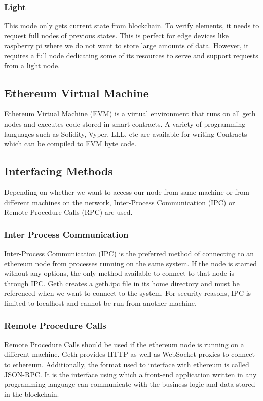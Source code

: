 \documentclass[11pt,openright]{report}
\begin{document}
\subsubsection{Light}
This mode only gets current state from blockchain. To verify elements, it needs to request full nodes of previous states. This is perfect for edge devices like raspberry pi where we do not want to store large amounts of data. However, it requires a full node dedicating some of its resources to serve and support requests from a light node.

\subsection{Ethereum Virtual Machine}
Ethereum Virtual Machine (EVM) is a virtual environment that runs on all geth nodes and executes code stored in smart contracts. A variety of programming languages such as Solidity, Vyper, LLL, etc are available for writing Contracts which can be compiled to EVM byte code.

\subsection{Interfacing Methods}
Depending on whether we want to access our node from same machine or from different machines on the network, Inter-Process Communication (IPC) or Remote Procedure Calls (RPC) are used.

\subsubsection{Inter Process Communication}
Inter-Process Communication (IPC) is the preferred method of connecting to an ethereum node from processes running on the same system. If the node is started without any options, the only method available to connect to that node is through IPC. Geth creates a geth.ipc file in its home directory and must be referenced when we want to connect to the system. For security reasons, IPC is limited to localhost and cannot be run from another machine.

\subsubsection{Remote Procedure Calls}
Remote Procedure Calls should be used if the ethereum node is running on a different machine. Geth provides HTTP as well as WebSocket proxies to connect to ethereum. Additionally, the format used to interface with ethereum is called JSON-RPC. It is the interface using which a front-end application written in any programming language can communicate with the business logic and data stored in the blockchain.
\end{document}
